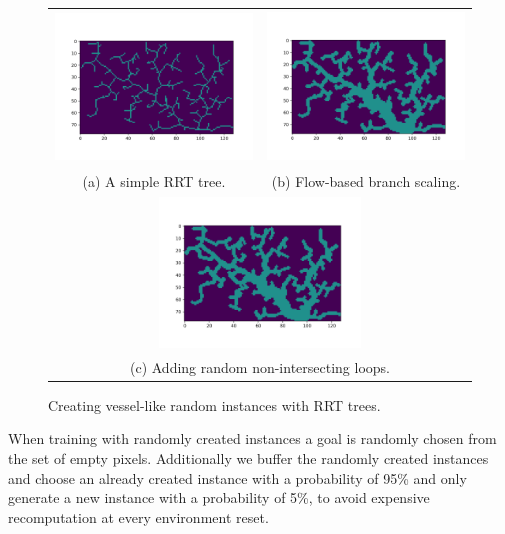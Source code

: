 \begin{figure}[ht]
    \begin{center}
    \begin{tabular}{cc}
    \includegraphics[clip, trim=40 40 40 40, height=4cm]{figures/implementation/rrt_base.png} &
    \includegraphics[clip, trim=40 40 40 40, height=4cm]{figures/implementation/rrt_base_flow.png} \\
    {\footnotesize (a) A simple RRT tree.} &
    {\footnotesize (b) Flow-based branch scaling.} \\
    \multicolumn{2}{c}{\includegraphics[clip, trim=40 40 40 40, height=4cm]{figures/implementation/rrt_base_loops.png}} \\
    \multicolumn{2}{c}{{\footnotesize (c) Adding random non-intersecting loops.}}
    \end{tabular}
    \end{center}
    \caption[Random Instance Generation]{Creating vessel-like random instances with RRT trees.}
    \label{fig:RRTTrees}
  \end{figure}

When training with randomly created instances a goal is randomly chosen from the set of empty pixels. Additionally we buffer the randomly created instances and choose an already created instance with a probability of 95\% and only generate a new instance with a probability of 5\%, to avoid expensive recomputation at every environment reset.

